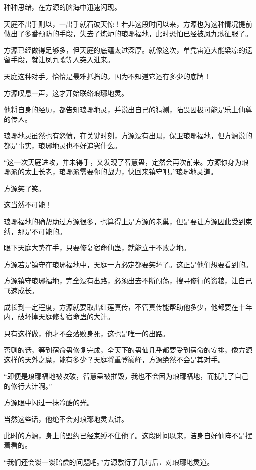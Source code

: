 \begin{this_body}
种种思绪，在方源的脑海中迅速闪现。

天庭不出手则以，一出手就石破天惊！若非这段时间以来，方源也为这种情况提前做出了多番预防的手段，失去了炼炉的琅琊福地，此时恐怕已经被凤九歌征服了。

方源已经做得足够多，但天庭的底蕴太过深厚。就像这次，单凭宙道大能梁凉的遗留手段，就让凤九歌等人突入进来。

天庭这种对手，恰恰是最难抵挡的。因为不知道它还有多少的底牌！

方源叹息一声，这才开始联络琅琊地灵。

他将自身的经历，都告知琅琊地灵，并说出自己的猜测，陆畏因极可能是乐土仙尊的传人。

琅琊地灵虽然也有怨愤，在关键时刻，方源没有出现，保卫琅琊福地，但方源说的都是事实，琅琊地灵也不好追究什么。

“这一次天庭进攻，并未得手，又发现了智慧蛊，定然会再次前来。方源你身为琅琊派的太上长老，琅琊派需要你的战力，快回来镇守吧。”琅琊地灵道。

方源笑了笑。

这当然不可能！

琅琊福地的确帮助过方源很多，也算得上是方源的老巢，但是要让方源因此受到束缚，那是不可能的。

眼下天庭大势在手，只要修复宿命仙蛊，就能立于不败之地。

方源若是镇守在琅琊福地中，天庭一方必定都要笑坏了。这正是他们想要看到的。

方源镇守琅琊福地，完全没有出路，必须出去不断闯荡，搜寻修行的资粮，让自己飞速成长。

成长到一定程度，方源就要取出红莲真传，不管真传能帮助他多少，他都要在十年内，破坏掉天庭修复宿命蛊的大计。

只有这样做，他才不会落败身死，这也是唯一的出路。

否则的话，等到宿命蛊修复完成，全天下的蛊仙几乎都要受到宿命的安排，像方源这样的天外之魔，能有多少？天庭将重登巅峰，方源绝然不会是其对手。

“即便是琅琊福地被攻破，智慧蛊被摧毁，我也不会因为琅琊福地，而扰乱了自己的修行大计啊。”

方源眼中闪过一抹冷酷的光。

当然这些话，他绝不会对琅琊地灵去讲。

此时的方源，身上的盟约已经束缚不住他了。这段时间以来，洁身自好仙阵不是摆着看的。

“我们还会谈一谈赔偿的问题吧。”方源敷衍了几句后，对琅琊地灵道。


\end{this_body}

